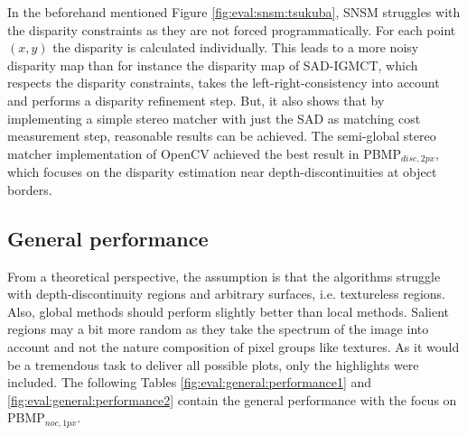 \noindent In the beforehand mentioned Figure \ref{fig:eval:snsm:tsukuba}, SNSM struggles with the disparity constraints as they are not forced programmatically.
For each point $(x,y)$ the disparity is calculated individually.
This leads to a more noisy disparity map than for instance the disparity map of SAD-IGMCT, which respects the disparity constraints, takes the left-right-consistency into account and performs a disparity refinement step.
But, it also shows that by implementing a simple stereo matcher with just the SAD as matching cost measurement step, reasonable results can be achieved.
The semi-global stereo matcher implementation of OpenCV achieved the best result in PBMP$_{disc,2px}$, which focuses on the disparity estimation near depth-discontinuities at object borders.

\subsection{General performance}

From a theoretical perspective, the assumption is that the algorithms struggle with depth-discontinuity regions and arbitrary surfaces, i.e. textureless regions.
Also, global methods should perform slightly better than local methods.
Salient regions may a bit more random as they take the spectrum of the image into account and not the nature composition of pixel groups like textures.
As it would be a tremendous task to deliver all possible plots, only the highlights were included.
\newline\newline\noindent The following Tables \ref{fig:eval:general:performance1} and \ref{fig:eval:general:performance2} contain the general performance with the focus on PBMP$_{noc,1px}$.

\begin{table}[h!]
\centering
{}
\caption[Result table for general performance]{Result table for general performance, focusing on PBMP$_{noc,1px}$}
\label{fig:eval:general:performance1}
\end{table}

